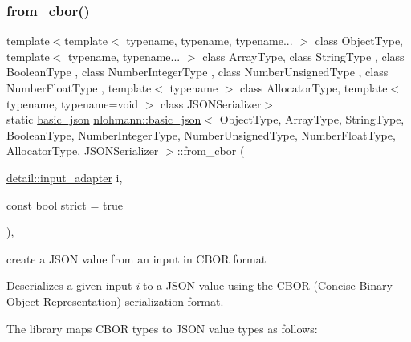 \subsubsection{\texorpdfstring{from\+\_\+cbor()}{from\_cbor()}\hspace{0.1cm}{\footnotesize\ttfamily [1/2]}}
{\footnotesize\ttfamily template$<$template$<$ typename, typename, typename... $>$ class Object\+Type, template$<$ typename, typename... $>$ class Array\+Type, class String\+Type , class Boolean\+Type , class Number\+Integer\+Type , class Number\+Unsigned\+Type , class Number\+Float\+Type , template$<$ typename $>$ class Allocator\+Type, template$<$ typename, typename=void $>$ class J\+S\+O\+N\+Serializer$>$ \\
static \hyperlink{classnlohmann_1_1basic__json}{basic\+\_\+json} \hyperlink{classnlohmann_1_1basic__json}{nlohmann\+::basic\+\_\+json}$<$ Object\+Type, Array\+Type, String\+Type, Boolean\+Type, Number\+Integer\+Type, Number\+Unsigned\+Type, Number\+Float\+Type, Allocator\+Type, J\+S\+O\+N\+Serializer $>$\+::from\+\_\+cbor (\begin{DoxyParamCaption}\item[{\hyperlink{classnlohmann_1_1detail_1_1input__adapter}{detail\+::input\+\_\+adapter}}]{i,  }\item[{const bool}]{strict = {\ttfamily true} }\end{DoxyParamCaption})\hspace{0.3cm}{\ttfamily [inline]}, {\ttfamily [static]}}



create a J\+S\+ON value from an input in C\+B\+OR format 

Deserializes a given input {\itshape i} to a J\+S\+ON value using the C\+B\+OR (Concise Binary Object Representation) serialization format.

The library maps C\+B\+OR types to J\+S\+ON value types as follows\+:

